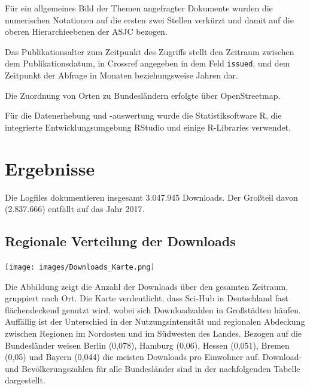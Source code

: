 \documentclass[a4paper,
fontsize=11pt,
oneside,
numbers=noperiodatend,
parskip=half-,
bibliography=totoc,
final
]{scrartcl}
\begin{document}
Für ein allgemeines Bild der Themen angefragter Dokumente wurden die
numerischen Notationen auf die ersten zwei Stellen verkürzt und damit
auf die oberen Hierarchieebenen der ASJC bezogen.

Das Publikationsalter zum Zeitpunkt des Zugriffs stellt den Zeitraum
zwischen dem Publikationsdatum, in Crossref angegeben in dem Feld
\texttt{issued}, und dem Zeitpunkt der Abfrage in Monaten
beziehungsweise Jahren dar.

Die Zuordnung von Orten zu Bundesländern erfolgte über OpenStreetmap.

Für die Datenerhebung und -auswertung wurde die Statistiksoftware R, die
integrierte Entwicklungsumgebung RStudio und einige R-Libraries
verwendet.

\hypertarget{ergebnisse}{%
\section{Ergebnisse}\label{ergebnisse}}

Die Logfiles dokumentieren insgesamt 3.047.945 Downloads. Der Großteil
davon (2.837.666) entfällt auf das Jahr 2017.

\hypertarget{regionale-verteilung-der-downloads}{%
\subsection{Regionale Verteilung der
Downloads}\label{regionale-verteilung-der-downloads}}

\texttt{[image: images/Downloads\_Karte.png]}

Die Abbildung zeigt die Anzahl der Downloads über den gesamten Zeitraum,
gruppiert nach Ort. Die Karte verdeutlicht, dass Sci-Hub in Deutschland
fast flächendeckend genutzt wird, wobei sich Downloadzahlen in
Großstädten häufen. Auffällig ist der Unterschied in der
Nutzungsintensität und regionalen Abdeckung zwischen Regionen im
Nordosten und im Südwesten des Landes. Bezogen auf die Bundesländer
weisen Berlin (0,078), Hamburg (0,06), Hessen (0,051), Bremen (0,05) und
Bayern (0,044) die meisten Downloads pro Einwohner auf. Download- und
Bevölkerungszahlen für alle Bundesländer sind in der nachfolgenden
Tabelle dargestellt.
\end{document}
